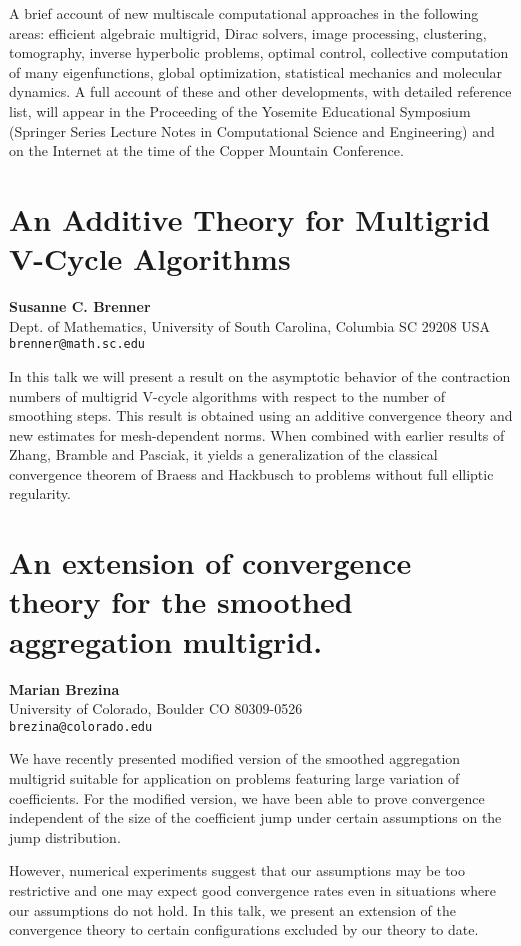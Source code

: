 \documentclass[11pt]{article}
\newcommand{\nextab}[4]{
	\section{#2}
	{\bf #1} \\ \nopagebreak
	{#3} \\ \nopagebreak
	{\tt #4} \nopagebreak
	}
\begin{document}
A brief account of new multiscale computational approaches in
the following areas: efficient algebraic multigrid, Dirac solvers,
image processing, clustering, tomography, inverse hyperbolic problems,
optimal control, collective computation of many eigenfunctions,
global optimization, statistical mechanics and molecular dynamics.
A full account of these and other developments, with detailed
reference list, will appear in the Proceeding of the Yosemite
Educational Symposium (Springer Series Lecture Notes in Computational
Science and Engineering) and on the Internet at the time of the
Copper Mountain Conference.



\nextab
{Susanne C. Brenner}
{An Additive Theory for Multigrid V-Cycle Algorithms}
{Dept. of Mathematics, University of South Carolina, Columbia SC 29208 USA}
{brenner@math.sc.edu}



In this talk we will present a result on the asymptotic
behavior of the contraction numbers of multigrid V-cycle
algorithms with respect to the number of smoothing steps.
This result is obtained using an additive convergence theory
and new estimates for mesh-dependent norms.  When combined
with earlier results of Zhang, Bramble and Pasciak, it yields
a generalization of the classical convergence theorem of
Braess and Hackbusch to problems without full elliptic regularity.




\nextab
{Marian Brezina}
{An extension of convergence theory for the smoothed aggregation multigrid.}
{University of Colorado, Boulder CO 80309-0526}
{brezina@colorado.edu}


We have recently presented modified version of the smoothed aggregation
multigrid suitable for application on problems featuring large variation of
coefficients. For the modified version, we have been able to prove convergence
independent of the size of the coefficient jump under certain assumptions
on the jump distribution.

However, numerical experiments suggest that our assumptions may be too
restrictive and one may expect good convergence rates even
in situations where our assumptions do not hold.
In this talk, we present an extension of the convergence theory to certain
configurations excluded by our theory to date.
\end{document}
